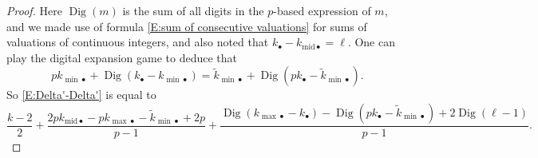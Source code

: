\documentclass[12pt]{amsart}
\theoremstyle{definition}
\numberwithin{equation}{subsection}
\DeclareMathOperator{\Dig}{Dig}
\newcommand{\midd}{\mathrm{mid}}
\begin{document}
\begin{proof}
Here $\Dig(m)$ is the sum of all digits in the $p$-based expression of $m$, and we made use of formula \eqref{E:sum of consecutive valuations} for sums of valuations of continuous integers, and also noted that $k_\bullet - k_{\midd\bullet} = \ell$.
One can play the digital expansion game to deduce that
\begin{equation}
\label{E:digital expansion game}
pk_{{\min}\bullet}+ \Dig(k_{\bullet} - k_{{\min}\bullet}) = \tilde k_{{\min}\bullet}+ \Dig(pk_{\bullet} - \tilde k_{{\min}\bullet}).
\end{equation}
So \eqref{E:Delta'-Delta'} is equal to \begin{equation}
\label{E:Delta'-Delta'2}
\frac{k-2}2+ \frac {2pk_{\midd \bullet}-p k_{{\max}\bullet}- \tilde k_{{\min}\bullet}+2p}{p-1}+\frac{\Dig(k_{{\max}\bullet} - k_{\bullet})- \Dig (pk_{\bullet} - \tilde  k_{{\min}\bullet})+2\Dig (\ell-1)}{p-1}.
\end{equation} 


\end{proof}
\end{document}
